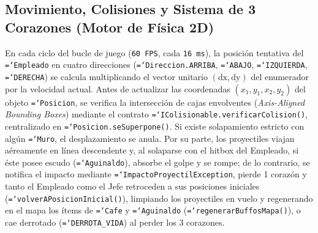 \documentclass[12pt, a4paper]{article}
\DeclareRobustCommand{\code}[1]{\textcolor{codegreen}{\texttt{\hyphenchar\font=`\-#1}}}
\begin{document}
\subsection{Movimiento, Colisiones y Sistema de 3 Corazones (Motor de Física 2D)}
En cada ciclo del bucle de juego (\texttt{60 FPS}, cada \texttt{16 ms}), la posición tentativa del \code{Empleado} en cuatro direcciones (\code{Direccion.ARRIBA}, \code{ABAJO}, \code{IZQUIERDA}, \code{DERECHA}) se calcula multiplicando el vector unitario $(\text{dx}, \text{dy})$ del enumerador por la velocidad actual. Antes de actualizar las coordenadas $(x_1, y_1, x_2, y_2)$ del objeto \code{Posicion}, se verifica la intersección de cajas envolventes (\textit{Axis-Aligned Bounding Boxes}) mediante el contrato \code{IColisionable.verificarColision()}, centralizado en \code{Posicion.seSuperpone()}. Si existe solapamiento estricto con algún \code{Muro}, el desplazamiento se anula. Por su parte, los proyectiles viajan aéreamente en línea descendente y, al solaparse con el hitbox del Empleado, si éste posee escudo (\code{Aguinaldo}), absorbe el golpe y se rompe; de lo contrario, se notifica el impacto mediante \code{ImpactoProyectilException}, pierde 1 corazón y tanto el Empleado como el Jefe retroceden a sus posiciones iniciales (\code{volverAPosicionInicial()}), limpiando los proyectiles en vuelo y regenerando en el mapa los ítems de \code{Cafe} y \code{Aguinaldo} (\code{regenerarBuffosMapa()}), o cae derrotado (\code{DERROTA\_VIDA}) al perder los 3 corazones.
\end{document}
